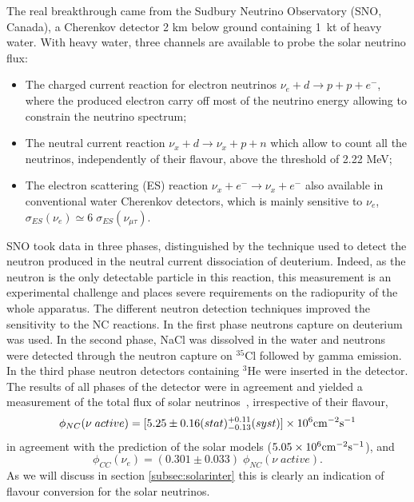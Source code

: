 The real breakthrough came from the Sudbury Neutrino Observatory (SNO, Canada), a Cherenkov detector 2 km below ground containing 1~kt of heavy water. 
With heavy water, three channels are available to probe the solar neutrino flux: 
\begin{itemize}
\item The charged current reaction for electron neutrinos $ \nu_e + d \rightarrow p + p + e^−$, where the produced electron carry off most of the neutrino energy allowing to constrain the neutrino spectrum;
\item The neutral current reaction $ \nu_x + d \rightarrow \nu_x +  p + n $ which allow to count all the neutrinos, independently of their flavour, above the threshold of 2.22 MeV; 
\item The electron scattering (ES) reaction $ \nu_x + e^- \rightarrow \nu_x + e^−$ also available in conventional water Cherenkov detectors, which is mainly sensitive to $ \nu_e$, $\sigma_{ES}(\nu_e)\simeq 6 \; \sigma_{ES}(\nu_{\mu \tau})$. 
\end{itemize}
SNO took data in three phases, distinguished by the technique used to detect the neutron produced in the neutral current dissociation of deuterium. Indeed, as the neutron is the only detectable particle in this reaction, this measurement is an experimental challenge and places severe requirements on the radiopurity of the whole apparatus. The different neutron detection techniques improved the sensitivity to the NC reactions. In the first phase neutrons capture on deuterium was used. In the second phase, NaCl was dissolved in the water and neutrons were detected through the neutron capture on $^{35}$Cl followed by gamma emission. In the third phase neutron detectors containing $^3$He were inserted in the detector.
The results of all phases of the detector were in agreement and yielded a measurement of the total flux of solar neutrinos~\cite{aharmim}, irrespective of their flavour,
\begin{equation}
\phi_{NC} (\nu \; active ) = [5.25 \pm 0.16 (stat) ^{+0.11}
_{-0.13} (syst)] \times 10^6 {\rm cm^{-2} s^{-1}} 
\end{equation}
in agreement with the prediction of the solar models ($5.05 \times 10^6 {\rm cm^{-2} s^{-1}}$), and 
\begin{equation}
\phi_{CC} (\nu_e ) =  (0.301 \pm 0.033) \; \phi_{NC} (\nu \; active ).
\end{equation}
As we will discuss in section
 \ref{subsec:solarinter} this is clearly an indication of flavour conversion for the solar neutrinos. 

